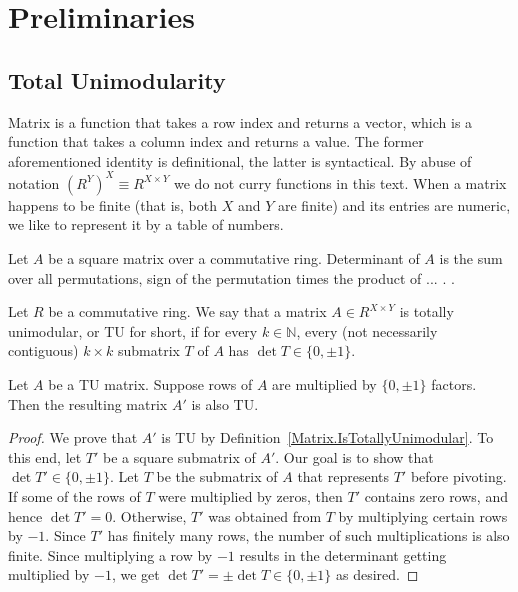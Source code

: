 \chapter{Preliminaries}

\section{Total Unimodularity}

\begin{definition}
    \label{Matrix}
    \leanok
    Matrix is a function that takes a row index and returns a vector, which is a function that takes a column index and returns a value.
    The former aforementioned identity is definitional, the latter is syntactical.
    By abuse of notation $\left(R^Y\right)^X \equiv R^{X \times Y}$ we do not curry functions in this text.
    When a matrix happens to be finite (that is, both $X$ and $Y$ are finite) and its entries are numeric, we like to represent it by a table of numbers.
\end{definition}

\begin{definition}
    \label{Matrix.det}
    \leanok
    Let $A$ be a square matrix over a commutative ring. Determinant of $A$ is the sum over all permutations, sign of the permutation times the product of ... . .
\end{definition}

\begin{definition}
    \label{Matrix.IsTotallyUnimodular}
    \leanok
    Let $R$ be a commutative ring. We say that a matrix $A \in R^{X \times Y}$ is totally unimodular, or TU for short, if for every $k \in \mathbb{N}$, every (not necessarily contiguous) $k \times k$ submatrix $T$ of $A$ has $\det T \in \{0, \pm 1\}$.
\end{definition}

\begin{lemma}
    \label{Matrix.IsTotallyUnimodular.mul_rows}
    \leanok
    Let $A$ be a TU matrix. Suppose rows of $A$ are multiplied by $\{0, \pm 1\}$ factors. Then the resulting matrix $A'$ is also TU.
\end{lemma}

\begin{proof}
    \leanok
    We prove that $A'$ is TU by Definition~\ref{Matrix.IsTotallyUnimodular}. To this end, let $T'$ be a square submatrix of $A'$. Our goal is to show that $\det T' \in \{0, \pm 1\}$. Let $T$ be the submatrix of $A$ that represents $T'$ before pivoting. If some of the rows of $T$ were multiplied by zeros, then $T'$ contains zero rows, and hence $\det T' = 0$. Otherwise, $T'$ was obtained from $T$ by multiplying certain rows by $-1$. Since $T'$ has finitely many rows, the number of such multiplications is also finite. Since multiplying a row by $-1$ results in the determinant getting multiplied by $-1$, we get $\det T' = \pm \det T \in \{0, \pm 1\}$ as desired.
\end{proof}

